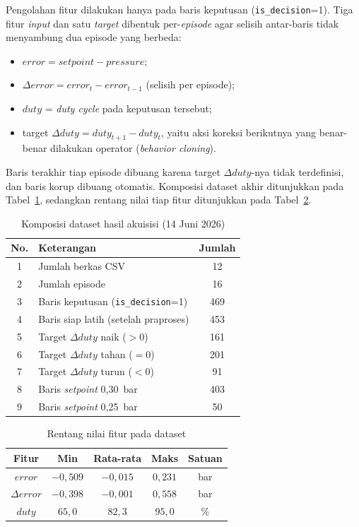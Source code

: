 Pengolahan fitur dilakukan hanya pada baris keputusan
(\texttt{is\_decision}=1). Tiga fitur \emph{input} dan satu \emph{target}
dibentuk per-\emph{episode} agar selisih antar-baris tidak menyambung dua
episode yang berbeda:
\begin{itemize}
  \item $error = setpoint - pressure$;
  \item $\Delta error = error_t - error_{t-1}$ (selisih per episode);
  \item $duty$ = \emph{duty cycle} pada keputusan tersebut;
  \item target $\Delta duty = duty_{t+1} - duty_{t}$, yaitu aksi koreksi
        berikutnya yang benar-benar dilakukan operator
        (\emph{behavior cloning}).
\end{itemize}
Baris terakhir tiap episode dibuang karena target $\Delta duty$-nya tidak
terdefinisi, dan baris korup dibuang otomatis. Komposisi dataset akhir
ditunjukkan pada Tabel~\ref{tab:komposisi-dataset}, sedangkan rentang
nilai tiap fitur ditunjukkan pada Tabel~\ref{tab:rentang-fitur}.

\begin{table}[H]
  \centering
  \caption{Komposisi dataset hasil akuisisi (14 Juni 2026)}
  \label{tab:komposisi-dataset}
  \begin{tabular}{|c|p{8cm}|c|}
  \hline
  \textbf{No.} & \textbf{Keterangan} & \textbf{Jumlah} \\
  \hline
  1 & Jumlah berkas CSV & 12 \\
  \hline
  2 & Jumlah episode & 16 \\
  \hline
  3 & Baris keputusan (\texttt{is\_decision}=1) & 469 \\
  \hline
  4 & Baris siap latih (setelah praproses) & 453 \\
  \hline
  5 & Target $\Delta duty$ naik ($>0$) & 161 \\
  \hline
  6 & Target $\Delta duty$ tahan ($=0$) & 201 \\
  \hline
  7 & Target $\Delta duty$ turun ($<0$) & 91 \\
  \hline
  8 & Baris \emph{setpoint} 0{,}30~bar & 403 \\
  \hline
  9 & Baris \emph{setpoint} 0{,}25~bar & 50 \\
  \hline
  \end{tabular}
\end{table}

\begin{table}[H]
  \centering
  \caption{Rentang nilai fitur pada dataset}
  \label{tab:rentang-fitur}
  \begin{tabular}{|c|c|c|c|c|}
  \hline
  \textbf{Fitur} & \textbf{Min} & \textbf{Rata-rata} & \textbf{Maks} & \textbf{Satuan} \\
  \hline
  $error$        & $-0{,}509$ & $-0{,}015$ & $0{,}231$ & bar \\
  \hline
  $\Delta error$ & $-0{,}398$ & $-0{,}001$ & $0{,}558$ & bar \\
  \hline
  $duty$         & $65{,}0$   & $82{,}3$   & $95{,}0$  & \% \\
  \hline
  \end{tabular}
\end{table}

